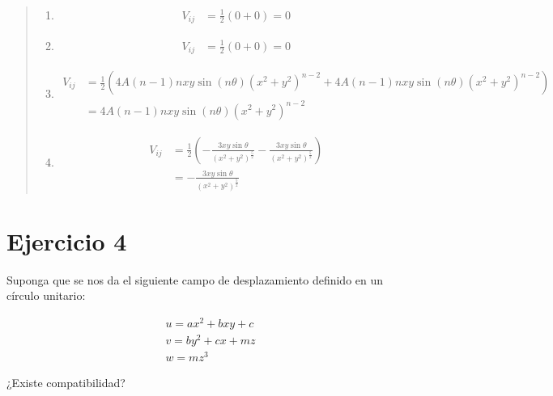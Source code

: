 \documentclass[a4paper,10pt,twoside,final,spanish]{article}
\begin{document}
\begin{quote}
\begin{enumerate}[a)]
	\begin{enumerate}[$\Psi$a.]
	\item 
	\begin{align*}
	V_{ij} &= \frac{1}{2}(0+0)=0
	\end{align*}
	
	\item 
	\begin{align*}
	V_{ij} &= \frac{1}{2}(0+0)=0
	\end{align*}
	
	\item 
	\begin{align*}
	V_{ij} &= \frac{1}{2}\left(4A(n-1)nxy\sin{(n\theta)}(x^{2}+y^{2})^{n-2}
	+4A(n-1)nxy\sin{(n\theta)}(x^{2}+y^{2})^{n-2}\right) \\
	&= 4A(n-1)nxy\sin{(n\theta)}(x^{2}+y^{2})^{n-2}
	\end{align*}
	
	\item
	\begin{align*}
	V_{ij} &= \frac{1}{2}\left(-\frac{3xy\sin{\theta}}{(x^{2}+y^{2})^{\frac{5}{2}}}
	-\frac{3xy\sin{\theta}}{(x^{2}+y^{2})^{\frac{5}{2}}}\right) \\
	&= -\frac{3xy\sin{\theta}}{(x^{2}+y^{2})^{\frac{5}{2}}}
	\end{align*}
	\end{enumerate}

\end{enumerate}

\end{quote}

\section*{Ejercicio 4}

Suponga que se nos da el siguiente campo de desplazamiento definido en un círculo unitario:

\[
\begin{array}{l}
u=ax^{2}+bxy+c \\
v=by^{2}+cx+mz \\
w=mz^{3}
\end{array}
\] 
 
¿Existe compatibilidad? 

\dotfill
\end{document}

